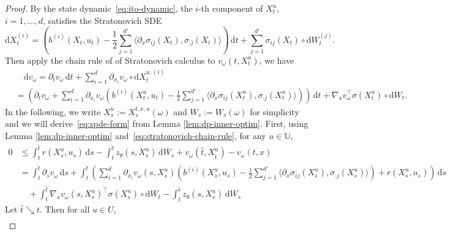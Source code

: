 \documentclass[11pt]{article}
\numberwithin{equation}{section}
\theoremstyle{plain}
\theoremstyle{definition}
\theoremstyle{remark}
\newcommand{\dd}{\mathrm{d}}
\begin{document}
\begin{proof}
By the state dynamic~\eqref{eq:ito-dynamic}, the $i$-th component of $X_t^u$, $i=1,\dots,d$, satisfies the Stratonovich SDE 
\begin{equation*}
    \dd X_t^{(i)} = \left( b^{(i)}(X_t, u_t) - \frac{1}{2} \sum_{j=1}^{d'} \langle \partial_{x} \sigma_{ij}(X_t), \sigma_{\cdot j}(X_t)\rangle \right)\,\dd t + \sum_{j=1}^{d'} \sigma_{ij}(X_t)\circ \dd W_t^{(j)}. 
\end{equation*}
Then apply the chain rule of of Stratonovich calculus to $v_\omega(t,X_t^u)$, we have 
\begin{equation} \label{eq:stratonovich-chain-rule}
\begin{aligned}
    &\quad \dd v_\omega = \partial_t v_\omega \,\dd t + \sum_{i=1}^d \partial_{x_i}v_\omega \circ \dd X_t^{u,(i)} \\
    &= \left(\partial_t v_\omega + \sum_{i=1}^d \partial_{x_i} v_\omega \left(b^{(i)}(X_t^u, u_t) - \frac{1}{2} \sum_{j=1}^{d'} \langle \partial_{x} \sigma_{ij}(X_t^u), \sigma_{\cdot j}(X_t^u)\rangle \right) \right)\,\dd t + \nabla_x v_\omega^\top \sigma(X_t^u) \circ \dd W_t. 
\end{aligned}
\end{equation}
In the following, we write $X_s^u := X_s^{t,x,u}(\omega)$ and $W_s := W_s(\omega)$ for simplicity and we will derive~\eqref{eq:spde-form} from Lemma \ref{lem:dp-inner-optim}. 
First, using Lemma \ref{lem:dp-inner-optim} and~\eqref{eq:stratonovich-chain-rule}, for any $u \in \mathbb{U}$, 
\begin{equation*}
\begin{aligned}
    0 &\le \int_t^{\hat{t}}r(X_s^{u}, u_s)\,\dd s - \int_t^{\hat{t}} z_\theta(s,X_s^{u})\,\dd W_s + v_\omega(\hat{t}, X_{\hat{t}}^{u}) - v_\omega(t,x) \\ 
    &= \int_t^{\hat{t}}\partial_s v_\omega \,\dd s + \int_t^{\hat{t}} \left(\sum_{i=1}^d \partial_{x_i} v_\omega(s, X_s^u) \left(b^{(i)}(X_s^u, u_s) - \frac{1}{2} \sum_{j=1}^{d'} \langle \partial_{x} \sigma_{ij}(X_s^u), \sigma_{\cdot j}(X_s^u)\rangle\right) + r(X_s^{u}, u_s) \right)\,\dd s \\
    &\quad + \int_t^{\hat{t}} \nabla_x v_\omega(s, X_s^u)^\top \sigma(X_s^u) \circ \dd W_t - \int_t^{\hat{t}} z_\theta(s, X_s^{u})\,\dd W_s
\end{aligned}
\end{equation*}
Let $\hat{t}\searrow t$. Then for all $u \in U$, 
\begin{equation*}
\begin{aligned}

\end{aligned}
\end{equation*}
\end{proof}
\end{document}
